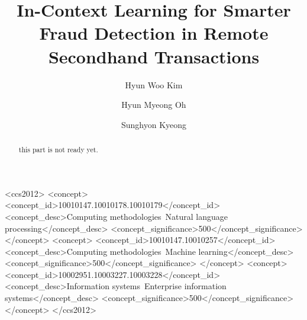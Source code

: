\documentclass[sigconf]{acmart}
\begin{document}
\title{In-Context Learning for Smarter Fraud Detection in Remote Secondhand Transactions}



\author{Hyun Woo Kim}



\author{Hyun Myeong Oh}



\author{Sunghyon Kyeong}




\renewcommand{\shortauthors}{Kim et al.}

\begin{abstract}
this part is not ready yet.
\end{abstract}

\begin{CCSXML}
  <ccs2012>
    <concept>
      <concept_id>10010147.10010178.10010179</concept_id>
      <concept_desc>Computing methodologies~Natural language processing</concept_desc>
      <concept_significance>500</concept_significance>
    </concept>
    <concept>
      <concept_id>10010147.10010257</concept_id>
      <concept_desc>Computing methodologies~Machine learning</concept_desc>
      <concept_significance>500</concept_significance>
    </concept>
    <concept>
      <concept_id>10002951.10003227.10003228</concept_id>
      <concept_desc>Information systems~Enterprise information systems</concept_desc>
      <concept_significance>500</concept_significance>
    </concept>
  </ccs2012>
\end{CCSXML}
\end{document}
